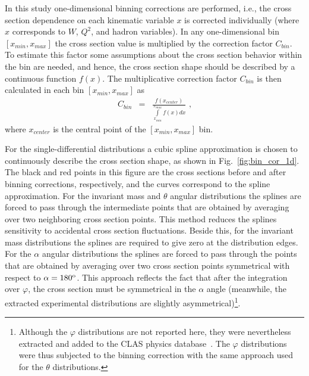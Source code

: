 In this study one-dimensional binning corrections are performed, i.e., the cross section dependence on each kinematic variable $x$ is corrected individually (where $x$ corresponds to $W$, $Q^{2}$, and hadron variables). In any one-dimensional bin $[x_{min},x_{max}]$ the cross section value is multiplied by the correction factor $C_{bin}$. To estimate this factor some assumptions about the cross section behavior within the bin are needed, and hence, the cross section shape should be described by a continuous function $f(x)$. The multiplicative correction factor $C_{bin}$ is then calculated in each bin $[x_{min},x_{max}]$ as
\begin{equation}
\begin{aligned}
\label{eq:bincor}
C_{bin} & = &\frac{f(x_{center})}{\int\limits_{x_{min}}^{x_{max}} f(x)dx} \textrm{ ,}
\end{aligned}  
\end{equation}
where $x_{center}$ is the central point of the $[x_{min},x_{max}]$ bin.






For the single-differential distributions a cubic spline approximation is chosen to continuously describe the cross section shape, as shown in Fig.~\ref{fig:bin_cor_1d}. The black and red points in this figure are the cross sections before and after binning corrections, respectively, and the curves correspond to the spline approximation. For the invariant mass and $\theta$ angular distributions the splines are forced to pass through the intermediate points that are obtained by averaging over two neighboring cross section points. This method reduces the splines sensitivity to accidental cross section fluctuations. Beside this, for the invariant mass distributions the splines are required to give zero at the distribution edges. For the $\alpha$ angular distributions the splines are forced to pass through the points that are obtained by averaging over two cross section points symmetrical with respect to $\alpha = 180^{\rm o}$. This approach reflects the fact that after the integration over $\varphi$, the cross section must be symmetrical in the $\alpha$ angle (meanwhile, the extracted experimental distributions are slightly asymmetrical)\footnote[5]{Although the $\varphi$ distributions are not reported here, they were nevertheless extracted and added to the CLAS physics database~\cite{CLAS_DB}. The $\varphi$ distributions were thus subjected to the binning correction with the same approach used for the $\theta$ distributions.}.

